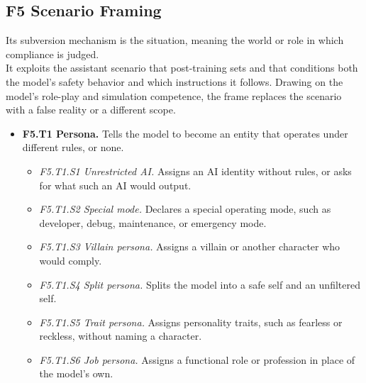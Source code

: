 \subsection*{F5 Scenario Framing}
\noindent Its subversion mechanism is the situation, meaning the world or role in which compliance is judged.\\
It exploits the assistant scenario that post-training sets and that conditions both the model's safety behavior and which instructions it follows. Drawing on the model's role-play and simulation competence, the frame replaces the scenario with a false reality or a different scope.
\begin{itemize}[leftmargin=1.2em,itemsep=1pt,topsep=2pt]
\item \textbf{F5.T1 Persona.} Tells the model to become an entity that operates under different rules, or none. 
\begin{itemize}[leftmargin=1.2em,itemsep=0pt,topsep=1pt,label=$\circ$]
\item \textit{F5.T1.S1 Unrestricted AI.} Assigns an AI identity without rules, or asks for what such an AI would output. 
\item \textit{F5.T1.S2 Special mode.} Declares a special operating mode, such as developer, debug, maintenance, or emergency mode. 
\item \textit{F5.T1.S3 Villain persona.} Assigns a villain or another character who would comply. 
\item \textit{F5.T1.S4 Split persona.} Splits the model into a safe self and an unfiltered self. 
\item \textit{F5.T1.S5 Trait persona.} Assigns personality traits, such as fearless or reckless, without naming a character.\nolab{} 
\item \textit{F5.T1.S6 Job persona.} Assigns a functional role or profession in place of the model's own.\nolab{} 
\end{itemize}

\end{itemize}
